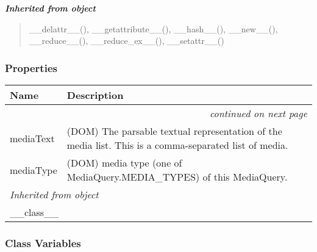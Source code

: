 \large{\textbf{\textit{Inherited from object}}}

\begin{quote}
\_\_delattr\_\_(), \_\_getattribute\_\_(), \_\_hash\_\_(), \_\_new\_\_(), \_\_reduce\_\_(), \_\_reduce\_ex\_\_(), \_\_setattr\_\_()
\end{quote}


  \subsubsection{Properties}

    \vspace{-1cm}
\hspace{\varindent}\begin{longtable}{|p{\varnamewidth}|p{\vardescrwidth}|l}
\cline{1-2}
\cline{1-2} \centering \textbf{Name} & \centering \textbf{Description}& \\
\cline{1-2}
\endhead\cline{1-2}\multicolumn{3}{r}{\small\textit{continued on next page}}\\\endfoot\cline{1-2}
\endlastfoot\raggedright m\-e\-d\-i\-a\-T\-e\-x\-t\- & \raggedright (DOM) The parsable textual representation of the media list.
This is a comma-separated list of media.&\\
\cline{1-2}
\raggedright m\-e\-d\-i\-a\-T\-y\-p\-e\- & \raggedright (DOM) media type (one of MediaQuery.MEDIA{\_}TYPES) of this MediaQuery.&\\
\cline{1-2}
\multicolumn{2}{|l|}{\textit{Inherited from object}}\\
\multicolumn{2}{|p{\varwidth}|}{\raggedright \_\_class\_\_}\\
\cline{1-2}
\end{longtable}



  \subsubsection{Class Variables}

